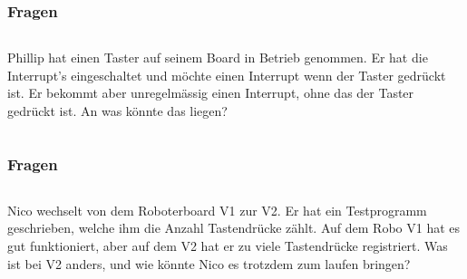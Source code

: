 
\begin{frame}
  \frametitle{Fragen}
	    \begin{column}{1\linewidth}
		Phillip hat einen Taster auf seinem Board in Betrieb genommen. Er hat die Interrupt’s eingeschaltet und möchte einen Interrupt wenn der Taster gedrückt ist. Er bekommt aber unregelmässig einen Interrupt, ohne das der Taster gedrückt ist. An was könnte das liegen?
	    \end{column}
\end{frame}

\begin{frame}
	\frametitle{Fragen}
	\begin{column}{1\linewidth}
	Nico wechselt von dem Roboterboard V1 zur V2. Er hat ein Testprogramm geschrieben, welche ihm die Anzahl Tastendrücke zählt. Auf dem Robo V1 hat es gut funktioniert, aber auf dem V2 hat er zu viele Tastendrücke registriert. Was ist bei V2 anders, und wie könnte Nico es trotzdem zum laufen bringen?
	\end{column}
\end{frame}